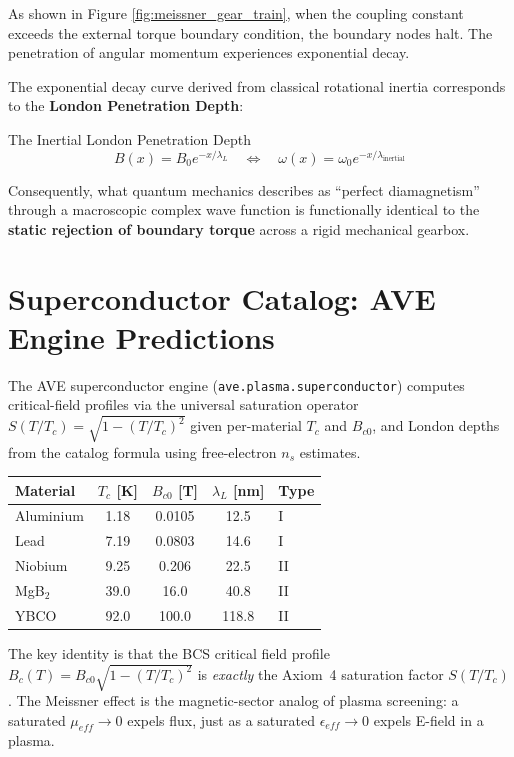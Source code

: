 As shown in Figure \ref{fig:meissner_gear_train}, when the coupling constant exceeds the external torque boundary condition, the boundary nodes halt. The penetration of angular momentum experiences exponential decay. 

The exponential decay curve derived from classical rotational inertia corresponds to the \textbf{London Penetration Depth}:
\begin{resultbox}{The Inertial London Penetration Depth}
\begin{equation}
    B(x) = B_0 e^{-x/\lambda_L} \quad \Longleftrightarrow \quad \omega(x) = \omega_0 e^{-x/\lambda_{\text{inertial}}}
\end{equation}
\end{resultbox}

Consequently, what quantum mechanics describes as ``perfect diamagnetism'' through a macroscopic complex wave function is functionally identical to the \textbf{static rejection of boundary torque} across a rigid mechanical gearbox.

\section{Superconductor Catalog: AVE Engine Predictions}

The AVE superconductor engine (\texttt{ave.plasma.superconductor}) computes critical-field profiles via the universal saturation operator $S(T/T_c) = \sqrt{1 - (T/T_c)^2}$ given per-material $T_c$ and $B_{c0}$, and London depths from the catalog formula using free-electron $n_s$ estimates.

\begin{center}
\small
\renewcommand{\arraystretch}{1.2}
\begin{tabularx}{\textwidth}{@{}lcccX@{}}
\toprule
\textbf{Material} & \textbf{$T_c$ [K]} & \textbf{$B_{c0}$ [T]} & \textbf{$\lambda_L$ [nm]} & \textbf{Type} \\
\midrule
Aluminium & 1.18  & 0.0105 & 12.5  & I \\
Lead      & 7.19  & 0.0803 & 14.6  & I \\
Niobium   & 9.25  & 0.206  & 22.5  & II \\
MgB$_2$   & 39.0  & 16.0   & 40.8  & II \\
YBCO      & 92.0  & 100.0  & 118.8 & II \\
\bottomrule
\end{tabularx}
\end{center}

\noindent The key identity is that the BCS critical field profile $B_c(T) = B_{c0}\sqrt{1-(T/T_c)^2}$ is \emph{exactly} the Axiom~4 saturation factor $S(T/T_c)$. The Meissner effect is the magnetic-sector analog of plasma screening: a saturated $\mu_{eff} \to 0$ expels flux, just as a saturated $\epsilon_{eff} \to 0$ expels E-field in a plasma.

